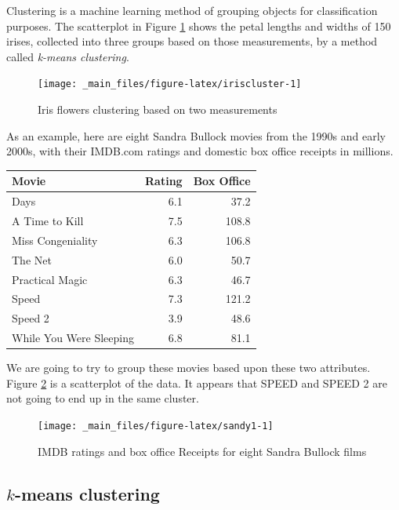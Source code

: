 \documentclass[
]{book}
\theoremstyle{definition}
\theoremstyle{definition}
\theoremstyle{definition}
\theoremstyle{definition}
\theoremstyle{remark}
\begin{document}
Clustering is a machine learning method of grouping objects for classification purposes. The scatterplot in Figure \ref{fig:iriscluster} shows the petal lengths and widths of 150 irises, collected into three groups based on those measurements, by a method called \emph{k-means clustering}.

\begin{figure}

{\centering \texttt{[image: \_main\_files/figure-latex/iriscluster-1]} 

}

\caption{Iris flowers clustering based on two measurements}\label{fig:iriscluster}
\end{figure}

As an example, here are eight Sandra Bullock movies from the 1990s and early 2000s, with their IMDB.com\autocite{IMDB} ratings and domestic box office receipts in millions.

\begin{longtable}[]{@{}lrr@{}}
\toprule\noalign{}
Movie & Rating & Box Office \\
\midrule\noalign{}
\endhead
\bottomrule\noalign{}
\endlastfoot
28 Days & 6.1 & 37.2 \\
A Time to Kill & 7.5 & 108.8 \\
Miss Congeniality & 6.3 & 106.8 \\
The Net & 6.0 & 50.7 \\
Practical Magic & 6.3 & 46.7 \\
Speed & 7.3 & 121.2 \\
Speed 2 & 3.9 & 48.6 \\
While You Were Sleeping & 6.8 & 81.1 \\
\end{longtable}

We are going to try to group these movies based upon these two attributes. Figure \ref{fig:sandy1} is a scatterplot of the data. It appears that SPEED and SPEED 2 are not going to end up in the same cluster.

\begin{figure}

{\centering \texttt{[image: \_main\_files/figure-latex/sandy1-1]} 

}

\caption{IMDB ratings and box office Receipts for eight Sandra Bullock films}\label{fig:sandy1}
\end{figure}

\subsection*{\texorpdfstring{\(k\)-means clustering}{k-means clustering}}\label{k-means-clustering-1}
\end{document}
